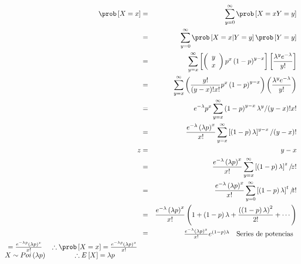 \begin{Ejem}
 \begin{eqnarray*}
\prob \left[X=x\right]&=& \sum_{y=0}^{\infty}\prob \left[X=x   Y=y \right]\\ 
&=& \sum_{y=0}^{\infty}\prob \left[X=x | Y=y \right]\prob \left[Y=y \right]\\ 
&=&\sum_{y=x}^{\infty} \left[ \left( 
\begin{array}{cc}
y \\ x
\end{array} \right) p^{x}\left(1-p\right)^{y-x}\right]\left[\frac{\lambda^{y}e^{-\lambda}}{y!}\right]\\
 &=& \sum_{y=x}^{\infty}\left( \frac{y!}{\left(y-x\right)! x!}p^{x}\left(1-p\right)^{y-x}\right)\left(\frac{\lambda^{y}e^{-\lambda}}{y!}\right)\\
 &=& e^{-\lambda}p^{x}\sum_{y=x}^{\infty}\left(1-p\right)^{y-x}\lambda^{y} /\! \left(y-x\right)!x!\\
 &=& \frac{e^{-\lambda}\left(\lambda p\right)^{x}}{x!} \sum_{y=x}^{\infty} \left[\left(1-p\right)\lambda\right]^{y-x}/\! \left(y-x\right)!\\
z &=& y-x\\
&=&  \frac{e^{-\lambda}\left(\lambda p\right)^{x}}{x!} \sum_{y=x}^{\infty} \left[\left(1-p\right)\lambda\right]^{z}/\! z! \\
&=&  \frac{e^{-\lambda}\left(\lambda p\right)^{x}}{x!} \sum_{y=0}^{\infty} \left[\left(1-p\right)\lambda\right]^{t}/\! t! \\
&=&  \frac{e^{-\lambda}\left(\lambda p\right)^{x}}{x!} \left(1 + \left(1-p\right)\lambda + \frac{\left(\left(1-p\right)\lambda\right)^{2}}{2!}+ \cdots \right) \\
&=& \begin{array}{cc} 
\frac{e^{-\lambda}\left(\lambda p\right)^{x}}{x!} e ^{\left(1-p\right)\lambda} & \textrm {Series de potencias} 
\end{array}\\
\begin{array}{cc} 
=\frac{e^{-\lambda p}\left(\lambda p\right)^{x}}{x!}   & \therefore \prob\left[X=x\right] = \frac{e^{-\lambda p}\left(\lambda p\right)^{x}}{x!}\\
X \sim Poi \left(\lambda p \right) & \therefore E\left[X\right] = \lambda p
\end{array}
 \end{eqnarray*}
\end{Ejem}

